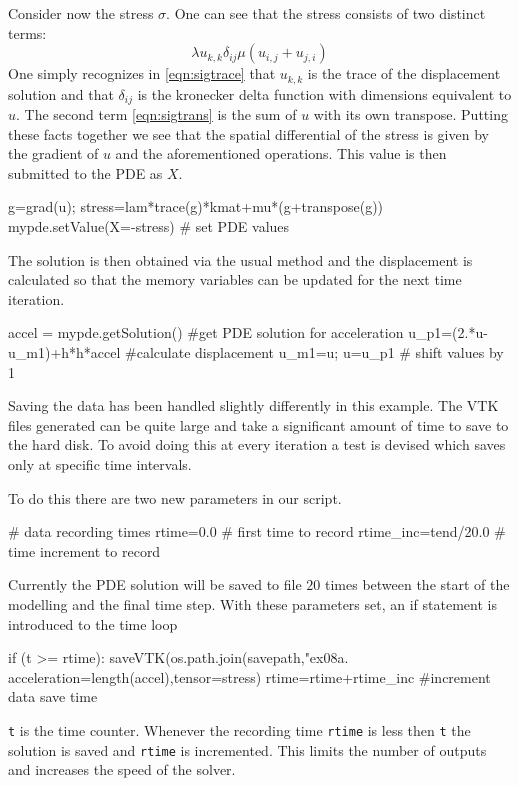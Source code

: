 Consider now the stress $\sigma$. One can see that the stress consists of two
distinct terms:
\begin{subequations}
\begin{equation} \label{eqn:sigtrace}
\lambda u_{k,k} \delta_{ij}
\end{equation}
\begin{equation} \label{eqn:sigtrans}
\mu (u_{i,j} + u_{j,i})
\end{equation}
\end{subequations}
One simply recognizes in \autoref{eqn:sigtrace} that $u_{k,k}$ is the
trace of the displacement solution and that $\delta_{ij}$ is the
kronecker delta function with dimensions equivalent to $u$. The second term
\autoref{eqn:sigtrans} is the sum of $u$ with its own transpose. Putting these
facts together we see that the spatial differential of the stress is given by the
gradient of $u$ and the aforementioned operations. This value is then submitted
to the \esc PDE as $X$.
\begin{python}
g=grad(u); stress=lam*trace(g)*kmat+mu*(g+transpose(g))
mypde.setValue(X=-stress) # set PDE values
\end{python}
The solution is then obtained via the usual method and the displacement is
calculated so that the memory variables can be updated for the next time
iteration.
\begin{python}
accel = mypde.getSolution() #get PDE solution for acceleration
u_p1=(2.*u-u_m1)+h*h*accel #calculate displacement
u_m1=u; u=u_p1 # shift values by 1
\end{python}

Saving the data has been handled slightly differently in this example. The VTK
files generated can be quite large and take a significant amount of time to save
to the hard disk. To avoid doing this at every iteration a test is devised which
saves only at specific time intervals.

To do this there are two new parameters in our script.
\begin{python}
# data recording times
rtime=0.0 # first time to record
rtime_inc=tend/20.0 # time increment to record
\end{python}
Currently the PDE solution will be saved to file $20$ times between the start of
the modelling and the final time step. With these parameters set, an if
statement is introduced to the time loop
\begin{python}
if (t >= rtime):
	saveVTK(os.path.join(savepath,"ex08a.%
    	acceleration=length(accel),tensor=stress)
    	rtime=rtime+rtime_inc #increment data save time
\end{python}
\verb!t! is the time counter. Whenever the recording time \verb!rtime! is less
then \verb!t! the solution is saved and \verb!rtime! is incremented. This
limits the number of outputs and increases the speed of the solver.

